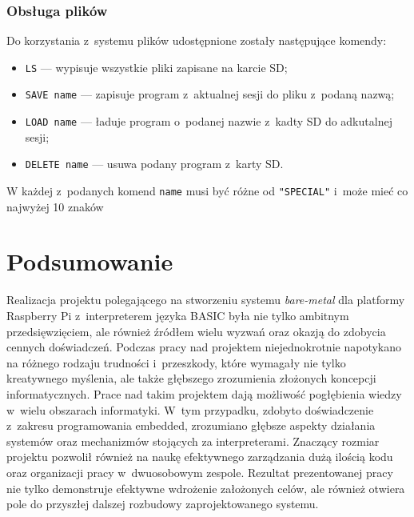\documentclass[shortabstract]{iithesis}
\begin{document}
\subsection{Obsługa plików}
Do korzystania z~systemu plików udostępnione zostały następujące komendy:
\begin{itemize}
 \item \texttt{LS} --- wypisuje wszystkie pliki zapisane na karcie SD;
 \item \texttt{SAVE name} --- zapisuje program z~aktualnej sesji do pliku z~podaną nazwą;
 \item \texttt{LOAD name} --- ładuje program o~podanej nazwie z~kadty SD do adkutalnej sesji;
 \item \texttt{DELETE name} --- usuwa podany program z~karty SD.
\end{itemize}
W każdej z~podanych komend \texttt{name} musi być różne od \texttt{"SPECIAL"} i~może mieć co najwyżej 10 znaków

\chapter*{Podsumowanie}
Realizacja projektu polegającego na stworzeniu systemu \textit{bare-metal} dla platformy Raspberry Pi z~interpreterem języka BASIC była nie tylko ambitnym przedsięwzięciem, ale również źródłem wielu wyzwań oraz okazją do zdobycia cennych doświadczeń. Podczas pracy nad projektem niejednokrotnie napotykano na różnego rodzaju trudności i~przeszkody, które wymagały nie tylko kreatywnego myślenia, ale także głębszego zrozumienia złożonych koncepcji informatycznych.
Prace nad takim projektem dają możliwość pogłębienia wiedzy w~wielu obszarach informatyki. W~tym przypadku, zdobyto doświadczenie z~zakresu programowania embedded, zrozumiano głębsze aspekty działania systemów oraz mechanizmów stojących za interpreterami. Znaczący rozmiar projektu pozwolił również na naukę efektywnego zarządzania dużą ilością kodu oraz organizacji pracy w~dwuosobowym zespole.
Rezultat prezentowanej pracy nie tylko demonstruje efektywne wdrożenie założonych celów, ale również otwiera pole do przyszłej dalszej rozbudowy zaprojektowanego systemu. 
\end{document}
